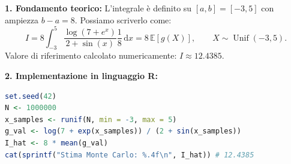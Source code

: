 \documentclass[11pt,a4paper]{article}
\newcommand{\EE}{\mathbb{E}}
\newcommand{\dx}{\mathrm{d}x}
\begin{document}
\begin{soluzionebox}
\textbf{1. Fondamento teorico:}
L'integrale è definito su $[a, b] = [-3, 5]$ con ampiezza $b - a = 8$. Possiamo scriverlo come:
\[
I = 8 \int_{-3}^5 \frac{\log(7 + e^x)}{2 + \sin(x)} \frac{1}{8} \, \dx = 8 \, \EE[g(X)], \qquad X \sim \operatorname{Unif}(-3, 5).
\]
Valore di riferimento calcolato numericamente: $I \approx \mathbf{12.4385}$.

\textbf{2. Implementazione in linguaggio R:}
\begin{lstlisting}[language=R]
set.seed(42)
N <- 1000000
x_samples <- runif(N, min = -3, max = 5)
g_val <- log(7 + exp(x_samples)) / (2 + sin(x_samples))
I_hat <- 8 * mean(g_val)
cat(sprintf("Stima Monte Carlo: %.4f\n", I_hat)) # 12.4385
\end{lstlisting}
\end{soluzionebox}
\end{document}
